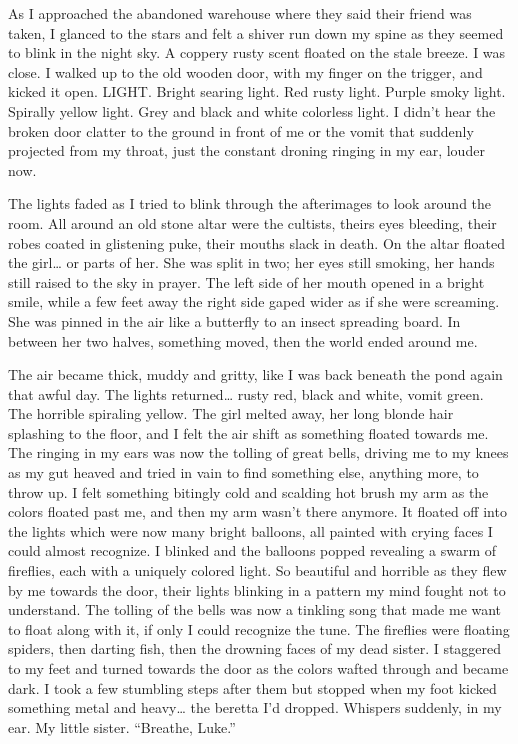 As I approached the abandoned warehouse where they said their
friend was taken, I glanced to the stars and felt a shiver run down
my spine as they seemed to blink in the night sky. A coppery rusty
scent floated on the stale breeze. I was close. I walked up to the
old wooden door, with my finger on the trigger, and kicked it open.
LIGHT. Bright searing light. Red rusty light. Purple smoky light.
Spirally yellow light. Grey and black and white colorless light. I
didn't hear the broken door clatter to the ground in front of
me or the vomit that suddenly projected from my throat, just the
constant droning ringing in my ear, louder now.



The lights faded as I tried to blink through the afterimages to
look around the room. All around an old stone altar were the
cultists, theirs eyes bleeding, their robes coated in glistening
puke, their mouths slack in death. On the altar floated the
girl{\ldots} or parts of her. She was split in two; her eyes still
smoking, her hands still raised to the sky in prayer. The left side
of her mouth opened in a bright smile, while a few feet away the
right side gaped wider as if she were screaming. She was pinned in
the air like a butterfly to an insect spreading board. In between
her two halves, something moved, then the world ended around
me.



The air became thick, muddy and gritty, like I was back beneath the
pond again that awful day. The lights returned{\ldots} rusty red,
black and white, vomit green. The horrible spiraling yellow. The
girl melted away, her long blonde hair splashing to the floor, and
I felt the air shift as something floated towards me. The ringing
in my ears was now the tolling of great bells, driving me to my
knees as my gut heaved and tried in vain to find something else,
anything more, to throw up. I felt something bitingly cold and
scalding hot brush my arm as the colors floated past me, and then
my arm wasn't there anymore. It floated off into the lights
which were now many bright balloons, all painted with crying faces
I could almost recognize. I blinked and the balloons popped
revealing a swarm of fireflies, each with a uniquely colored light.
So beautiful and horrible as they flew by me towards the door,
their lights blinking in a pattern my mind fought not to
understand. The tolling of the bells was now a tinkling song that
made me want to float along with it, if only I could recognize the
tune. The fireflies were floating spiders, then darting fish, then
the drowning faces of my dead sister. I staggered to my feet and
turned towards the door as the colors wafted through and became
dark. I took a few stumbling steps after them but stopped when my
foot kicked something metal and heavy{\ldots} the beretta I'd
dropped. Whispers suddenly, in my ear. My little sister.
``Breathe, Luke.''



